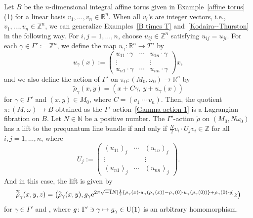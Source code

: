 \documentclass[pdftex]{sigma}
\numberwithin{equation}{section}
\newcommand{\C}{\mathbb{C}}
\newcommand{\R}{\mathbb{R}}
\newcommand{\Z}{\mathbb{Z}}
\newcommand{\N}{\mathbb{N}}
\renewcommand{\tilde}{\widetilde}
\newcommand{\vardbtilde}[1]{\tilde{\raisebox{0pt}[0.85\height]{$\tilde{#1}$}}}
\begin{document}
\begin{Example}\label{Ex4.8}
Let $B$ be the $n$-dimensional integral affine torus given in Example~\ref{affine torus}\,(1) for a linear basis $v_1,\ldots ,v_n\in \R^n$. When all $v_i$'s are integer vectors, i.e., $v_1,\ldots ,v_n\in \Z^n$, we can generalize Examples~\ref{B times T} and~\ref{Kodaira--Thurston} in the following way. For $i, j=1,\ldots , n$, choose $u_{ij}\in \Z^n$ satisfying $u_{ij}=u_{ji}$.
For each $\gamma \in \Gamma':=\Z^n$, we define the map $u_\gamma\colon \R^n\to T^n$ by
\[
u_\gamma (x):=
\begin{pmatrix}
u_{11}\cdot \gamma & \cdots & u_{1n}\cdot \gamma \\
\vdots & & \vdots \\
u_{n1}\cdot \gamma & \cdots & u_{nn}\cdot \gamma
\end{pmatrix}
x ,
\]
and we also define the action of $\Gamma'$ on $\pi_0\colon (M_0,\omega_0)\to \R^n$ by
\begin{equation}\label{Gamma-action 1}
{\tilde \rho}_\gamma (x,y)=\left(x+C\gamma,\ y+u_\gamma (x)\right)
\end{equation}
for $\gamma\in \Gamma'$ and $(x,y)\in M_0$, where $C=(v_1\ \cdots\ v_n)$. Then, the quotient $\pi\colon (M,\omega)\to B$ obtained as the $\Gamma'$-action~\eqref{Gamma-action 1} is a Lagrangian fibration on $B$.
%
Let $N\in \N$ be a positive number. The $\Gamma'$-action ${\tilde \rho}$ on $(M_0, N\omega_0)$ has a lift to the prequantum line bundle  if and only if $\frac{N}{2}v_i\cdot U_jv_i\in \Z$ for all $i, j=1,\ldots , n$, where
\[
U_j:=
\begin{pmatrix}
(u_{11})_j & \cdots & (u_{1n})_j \\
\vdots & & \vdots \\
(u_{n1})_j & \cdots & (u_{nn})_j
\end{pmatrix}.
\]
And in this case, the lift \smash{${\vardbtilde \rho}$} is given by
\[
{\vardbtilde \rho}_\gamma (x,y,z)=\bigl({\tilde \rho}_\gamma (x,y), g_\gamma {\rm e}^{2\pi\sqrt{-1}N[\frac{1}{2}\{\rho_\gamma (x)\cdot u_\gamma (\rho_\gamma (x))-\rho_\gamma(0)\cdot u_\gamma (\rho_\gamma (0))\}+\rho_\gamma(0)\cdot y]}z\bigr)
\]
for $\gamma\in \Gamma'$ and \smash{$(x,y,z)\in L_0^{\otimes N}\cong \R^n\times T^n\times \C$}, where $g\colon \Gamma' \ni \gamma\mapsto g_\gamma\in {\rm U}(1)$ is an arbitrary homomorphism.
\end{Example}
\end{document}
